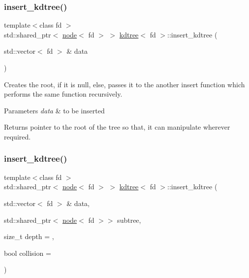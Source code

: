 \subsubsection{\texorpdfstring{insert\+\_\+kdtree()}{insert\_kdtree()}\hspace{0.1cm}{\footnotesize\ttfamily [1/2]}}
{\footnotesize\ttfamily template$<$class fd $>$ \\
std\+::shared\+\_\+ptr$<$ \hyperlink{classnode}{node}$<$ fd $>$ $>$ \hyperlink{classkdtree}{kdtree}$<$ fd $>$\+::insert\+\_\+kdtree (\begin{DoxyParamCaption}\item[{std\+::vector$<$ fd $>$ \&}]{data }\end{DoxyParamCaption})}



Creates the root, if it is null, else, passes it to the another insert function which performs the same function recursively. 


\begin{DoxyParams}{Parameters}
{\em data} & to be inserted \\
\hline
\end{DoxyParams}
\begin{DoxyReturn}{Returns}
pointer to the root of the tree so that, it can manipulate wherever required. 
\end{DoxyReturn}
\mbox{\label{classkdtree_a6ecd469b21764e96fd222835bef0ed0c}} 
\subsubsection{\texorpdfstring{insert\+\_\+kdtree()}{insert\_kdtree()}\hspace{0.1cm}{\footnotesize\ttfamily [2/2]}}
{\footnotesize\ttfamily template$<$class fd $>$ \\
std\+::shared\+\_\+ptr$<$ \hyperlink{classnode}{node}$<$ fd $>$ $>$ \hyperlink{classkdtree}{kdtree}$<$ fd $>$\+::insert\+\_\+kdtree (\begin{DoxyParamCaption}\item[{std\+::vector$<$ fd $>$ \&}]{data,  }\item[{std\+::shared\+\_\+ptr$<$ \hyperlink{classnode}{node}$<$ fd $>$$>$}]{subtree,  }\item[{size\+\_\+t}]{depth = {},  }\item[{bool}]{collision = {} }\end{DoxyParamCaption})}



